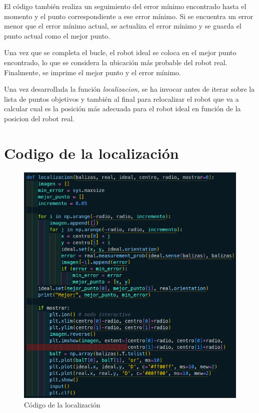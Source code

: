 \documentclass[11pt]{report}
\begin{document}
El código también realiza un seguimiento del error mínimo encontrado hasta el momento y el punto correspondiente a ese error mínimo. Si se 
encuentra un error menor que el error mínimo actual, se actualiza el error mínimo y se guarda el punto actual como el mejor punto.

Una vez que se completa el bucle, el robot ideal se coloca en el mejor punto encontrado, lo que se considera la ubicación más probable del 
robot real. Finalmente, se imprime el mejor punto y el error mínimo.

Una vez desarrollada la función \emph{localizacion}, se ha invocar antes de iterar sobre la lista de puntos objetivos y también al final 
para relocalizar el robot que va a calcular cual es la posición más adecuada para el robot ideal en función de la posicion del robot real.

\newpage

\section{Codigo de la localización}

\begin{figure}[H]
  \centering
  \includegraphics[scale=0.42]{img/localizacion.png}
  \caption{Código de la localización}
\end{figure}
\end{document}
